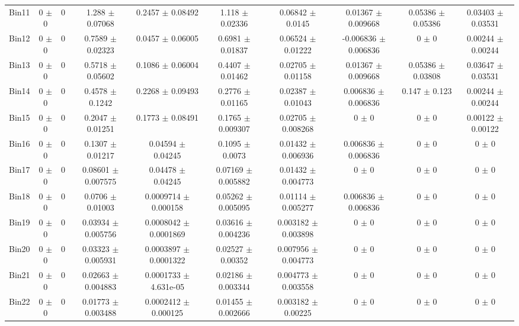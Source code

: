 \begin{tabular}{@{\extracolsep{4pt}}lccccccccc@{}}
     Bin11 & 0 $\pm$ 0 & 0 & 1.288 $\pm$ 0.07068 & 0.2457 $\pm$ 0.08492 & 1.118 $\pm$ 0.02336 & 0.06842 $\pm$ 0.0145 & 0.01367 $\pm$ 0.009668 & 0.05386 $\pm$ 0.05386 & 0.03403 $\pm$ 0.03531 \\ 
     Bin12 & 0 $\pm$ 0 & 0 & 0.7589 $\pm$ 0.02323 & 0.0457 $\pm$ 0.06005 & 0.6981 $\pm$ 0.01837 & 0.06524 $\pm$ 0.01222 & -0.006836 $\pm$ 0.006836 & 0 $\pm$ 0 & 0.00244 $\pm$ 0.00244 \\ 
     Bin13 & 0 $\pm$ 0 & 0 & 0.5718 $\pm$ 0.05602 & 0.1086 $\pm$ 0.06004 & 0.4407 $\pm$ 0.01462 & 0.02705 $\pm$ 0.01158 & 0.01367 $\pm$ 0.009668 & 0.05386 $\pm$ 0.03808 & 0.03647 $\pm$ 0.03531 \\ 
     Bin14 & 0 $\pm$ 0 & 0 & 0.4578 $\pm$ 0.1242 & 0.2268 $\pm$ 0.09493 & 0.2776 $\pm$ 0.01165 & 0.02387 $\pm$ 0.01043 & 0.006836 $\pm$ 0.006836 & 0.147 $\pm$ 0.123 & 0.00244 $\pm$ 0.00244 \\ 
     Bin15 & 0 $\pm$ 0 & 0 & 0.2047 $\pm$ 0.01251 & 0.1773 $\pm$ 0.08491 & 0.1765 $\pm$ 0.009307 & 0.02705 $\pm$ 0.008268 & 0 $\pm$ 0 & 0 $\pm$ 0 & 0.00122 $\pm$ 0.00122 \\ 
     Bin16 & 0 $\pm$ 0 & 0 & 0.1307 $\pm$ 0.01217 & 0.04594 $\pm$ 0.04245 & 0.1095 $\pm$ 0.0073 & 0.01432 $\pm$ 0.006936 & 0.006836 $\pm$ 0.006836 & 0 $\pm$ 0 & 0 $\pm$ 0 \\ 
     Bin17 & 0 $\pm$ 0 & 0 & 0.08601 $\pm$ 0.007575 & 0.04478 $\pm$ 0.04245 & 0.07169 $\pm$ 0.005882 & 0.01432 $\pm$ 0.004773 & 0 $\pm$ 0 & 0 $\pm$ 0 & 0 $\pm$ 0 \\ 
     Bin18 & 0 $\pm$ 0 & 0 & 0.0706 $\pm$ 0.01003 & 0.0009714 $\pm$ 0.000158 & 0.05262 $\pm$ 0.005095 & 0.01114 $\pm$ 0.005277 & 0.006836 $\pm$ 0.006836 & 0 $\pm$ 0 & 0 $\pm$ 0 \\ 
     Bin19 & 0 $\pm$ 0 & 0 & 0.03934 $\pm$ 0.005756 & 0.0008042 $\pm$ 0.0001869 & 0.03616 $\pm$ 0.004236 & 0.003182 $\pm$ 0.003898 & 0 $\pm$ 0 & 0 $\pm$ 0 & 0 $\pm$ 0 \\ 
     Bin20 & 0 $\pm$ 0 & 0 & 0.03323 $\pm$ 0.005931 & 0.0003897 $\pm$ 0.0001322 & 0.02527 $\pm$ 0.00352 & 0.007956 $\pm$ 0.004773 & 0 $\pm$ 0 & 0 $\pm$ 0 & 0 $\pm$ 0 \\ 
     Bin21 & 0 $\pm$ 0 & 0 & 0.02663 $\pm$ 0.004883 & 0.0001733 $\pm$ 4.631e-05 & 0.02186 $\pm$ 0.003344 & 0.004773 $\pm$ 0.003558 & 0 $\pm$ 0 & 0 $\pm$ 0 & 0 $\pm$ 0 \\ 
     Bin22 & 0 $\pm$ 0 & 0 & 0.01773 $\pm$ 0.003488 & 0.0002412 $\pm$ 0.000125 & 0.01455 $\pm$ 0.002666 & 0.003182 $\pm$ 0.00225 & 0 $\pm$ 0 & 0 $\pm$ 0 & 0 $\pm$ 0 \\ 

\end{tabular}
